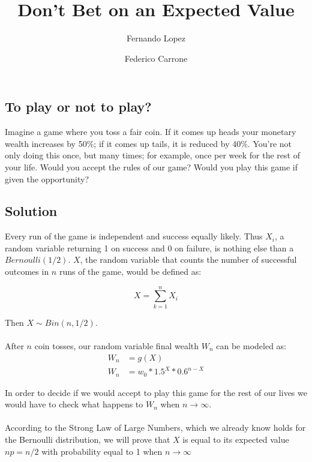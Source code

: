 \documentclass[12pt]{article}
\title{Don't Bet on an Expected Value}
\author{Fernando Lopez \and Federico Carrone}
\begin{document}
\maketitle
{}

\subsection{To play or not to play?}

Imagine a game where you toss a fair coin. If it comes up heads your monetary wealth increases by 50\%; if it comes up tails, it is reduced by 40\%. You’re not only doing this once, but many times; for example, once per week for the rest of your life. Would you accept the rules of our game? Would you play this game if given the opportunity?

\subsection{Solution}
Every run of the game is independent and success equally likely. Thus $X_i$, a random variable returning 1 on success and 0 on failure, is nothing else than a $Bernoulli(1/2)$. $X$, the random variable that counts the number of successful outcomes in $n$ runs of the game, would be defined as:

\begin{equation*}
 X = \sum\limits_{k=1}^{n} X_i
\end{equation*}

Then $X \sim Bin(n, 1/2)$.
\\\\
After $n$ coin tosses, our random variable final wealth $W_n$ can be modeled as:
\begin{equation*}
  \begin{split}
    W_n &= g(X)\\
    W_n &= w_0 * 1.5^X * 0.6^{n-X}
  \end{split}
\end{equation*}

In order to decide if we would accept to play this game for the rest of our lives we would have to check what happens to $W_n$ when $n \rightarrow \infty$.
\\\\
According to the Strong Law of Large Numbers, which we already know holds for the Bernoulli distribution, we will prove that $X$ is equal to its expected value $np = n/2$ with probability equal to 1 when $n \rightarrow \infty$
\end{document}
